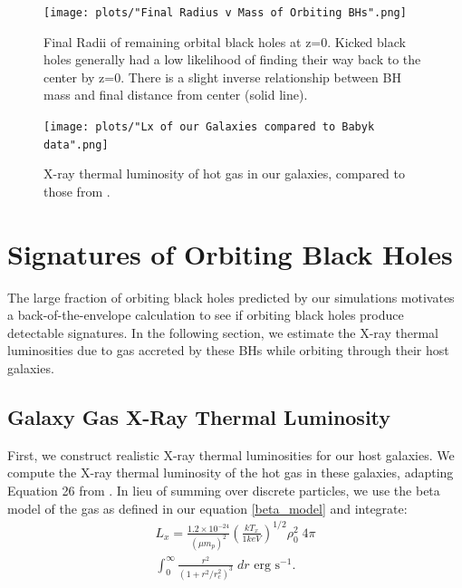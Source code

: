 \documentclass[fleqn,usenatbib,useAMS]{mnras}
\begin{document}
\begin{figure}
\begin{center}
\texttt{[image: plots/"Final Radius v Mass of Orbiting BHs".png]}
\caption{Final Radii of remaining orbital black holes at z=0.  Kicked black holes generally had a low likelihood of finding their way back to the center by z=0.  There is a slight inverse relationship between BH mass and final distance from center (solid line).}
\label{fig:mvr}
\end{center}
\end{figure}

\begin{figure}
\vspace{20pt}%
\begin{center}
\texttt{[image: plots/"Lx of our Galaxies compared to Babyk data".png]}
\caption{X-ray thermal luminosity of hot gas in our galaxies, compared to those from \citet{2018ApJ...857...32B}.}
\label{fig:galgas1}
\end{center}
\end{figure}


\section{Signatures of Orbiting Black Holes}
The large fraction of orbiting black holes predicted by our simulations motivates a back-of-the-envelope calculation to see if orbiting black holes produce detectable signatures. In the following section, we estimate the X-ray thermal luminosities due to gas accreted by these BHs while orbiting through their host galaxies.

\subsection{Galaxy Gas X-Ray Thermal Luminosity}
First, we construct realistic X-ray thermal luminosities for our host galaxies. We compute the X-ray thermal luminosity of the hot gas in these galaxies, adapting Equation 26 from \citet{2012ApJ...754..125C}. In lieu of summing over discrete particles, we use the beta model of the gas as defined in our equation \ref{beta_model} and integrate:
\begin{equation}
\begin{aligned}
    L_x ={} \frac{1.2 \times 10^{-24}}{(\mu m_p)^2}\left(\frac{kT_x}{1keV}\right)^{1/2}\rho_0^{2}\;4{\pi} \\
    \int_{0}^{\infty}\frac{r^2}{(1+r^2/r_c^2)^{3}}\;dr\text{  erg s}^{-1}.
\end{aligned}
\end{equation}
\end{document}
